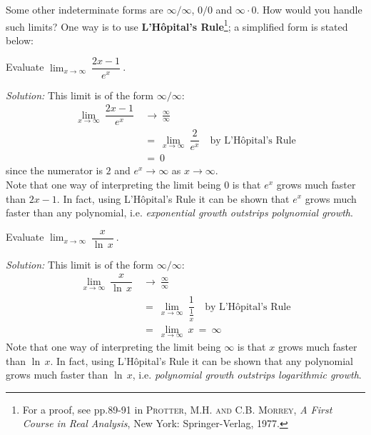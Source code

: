 Some other indeterminate forms are $\infty/\infty$, $0/0$ and $\infty \cdot 0$.
How would you handle such limits? One way is to use
\textbf{L'H\^{o}pital's Rule}\footnote{For a proof,
see pp.89-91 in \textsc{Protter, M.H. and C.B. Morrey}, \emph{A First Course in
Real Analysis}, New York: Springer-Verlag, 1977.}; a simplified form is stated
below:


\begin{exmp}\label{exmp:limxexpx}
\noindent Evaluate $\displaystyle\lim_{x \to \infty}~\dfrac{2x - 1}{e^x}~$.\vspace{1mm}
\par\noindent\emph{Solution:} This limit is of the form $\infty/\infty$:
\begin{align*}
\lim_{x \to \infty}~\dfrac{2x - 1}{e^x} ~&\to~ \frac{\infty}{\infty}\\
&=~ \lim_{x \to \infty}~\dfrac{2}{e^x} \quad\text{by L'H\^{o}pital's Rule}\\
&=~ 0
\end{align*}
since the numerator is $2$ and $e^x \to \infty$ as $x \to \infty$.\\
Note that one way of interpreting the limit being $0$ is that $e^x$ grows much
faster than $2x - 1$. In fact, using L'H\^{o}pital's Rule it can be shown that
$e^x$ grows much faster than any polynomial, i.e. \emph{exponential growth
outstrips polynomial growth}.
\end{exmp}
\divider
\newpage
\begin{exmp}\label{exmp:limxlnx}
\noindent Evaluate $\displaystyle\lim_{x \to \infty}~\dfrac{x}{\ln\,x}~$.\vspace{1mm}
\par\noindent\emph{Solution:} This limit is of the form $\infty/\infty$:
\begin{align*}
\lim_{x \to \infty}~\dfrac{x}{\ln\,x} ~&\to~ \frac{\infty}{\infty}\\
&=~ \lim_{x \to \infty}~\dfrac{1}{\frac{1}{x}} \quad\text{by L'H\^{o}pital's Rule}\\[6pt]
&=~ \lim_{x \to \infty}~x ~=~ \infty
\end{align*}
Note that one way of interpreting the limit being $\infty$ is that $x$ grows
much faster than $\ln\,x$. In fact, using L'H\^{o}pital's Rule it can be shown
that any polynomial grows much faster than $\ln\,x$, i.e. \emph{polynomial
growth outstrips logarithmic growth}.
\end{exmp}
